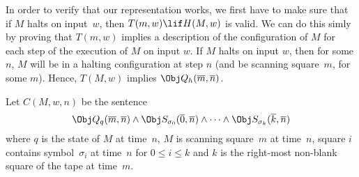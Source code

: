 \documentclass[../../../include/open-logic-section]{subfiles}
\begin{document}

\begin{explain}
 In order to verify that our representation works, we first
have to make sure that if $M$ halts on input~$w$, then $T(m, w) \lif H(M,
w)$ is valid. We can do this simly by proving that $T(m, w)$ implies a
description of the configuration of $M$ for each step of the execution of
$M$ on input $w$. If $M$ halts on input $w$, then for some $n$, $M$ will be
in a halting configuration at step $n$ (and be scanning square~$m$, for
some $m$). Hence, $T(M, w)$ implies $\Obj Q_h(\overline m, \overline n)$.
\end{explain}

\begin{defn} 
Let $C(M, w, n)$ be the sentence 
\[ 
\Obj Q_q(\overline m,
\overline n) \land \Obj S_{\sigma_0}(\overline 0, \overline n) \land \dots
\land \Obj S_{\sigma_k}(\overline k, \overline n) 
\] 
where $q$ is the state
of $M$ at time~$n$, $M$ is scanning square~$m$ at time~$n$, square $i$
contains symbol~$\sigma_i$ at time~$n$ for $0 \le i \le k$ and $k$ is the
right-most non-blank square of the tape at time~$m$. 
\end{defn}
\end{document}
